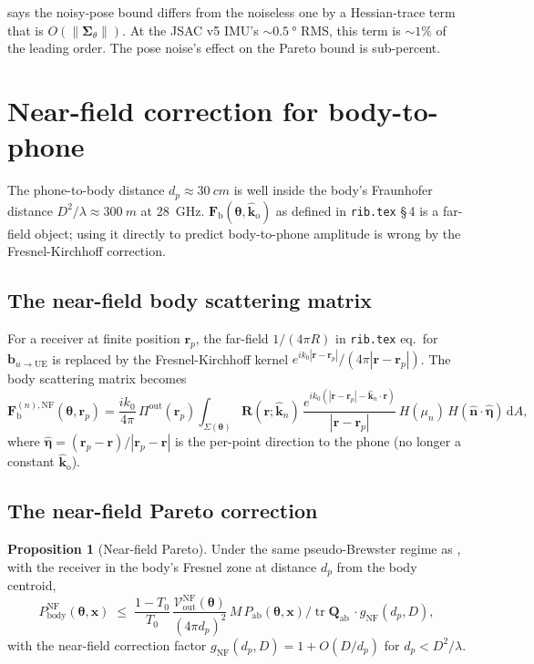 \documentclass[11pt,a4paper]{article}
\theoremstyle{definition}
\newtheorem{proposition}[proposition]{Proposition}
\newcommand{\khat}{\hat{\bm{k}}}
\newcommand{\nhat}{\hat{\bm{n}}}
\newcommand{\rr}{\mathbf{r}}
\DeclareMathOperator{\tr}{tr}
\newcommand{\diff}{\mathrm{d}}
\newcommand{\Qabs}{\mathbf{Q}_{\mathrm{ab}}}
\newcommand{\kout}{\hat{\bm{k}}_{\mathrm{o}}}
\newcommand{\Frib}{\mathbf{F}_{\mathrm{b}}}
\newcommand{\bvec}{\mathbf{b}}
\newcommand{\xvec}{\mathbf{x}}
\newcommand{\thetab}{\bm{\theta}}
\newcommand{\Pabs}{P_{\mathrm{ab}}}
\newcommand{\Pbody}{P_{\mathrm{body}}}
\begin{document}
 says the noisy-pose bound differs from
the noiseless one by a Hessian-trace term that is
$O(\|\bm\Sigma_\theta\|)$.  At the JSAC v5 IMU's $\sim
\SI{0.5}{\degree}$ RMS, this term is $\sim 1\%$ of the leading
order.  The pose noise's effect on the Pareto bound is
sub-percent.

\section{Near-field correction for body-to-phone}\label{sec:nearfield}

The phone-to-body distance $d_p\approx\SI{30}{cm}$ is well inside
the body's Fraunhofer distance $D^2/\lambda\approx\SI{300}{m}$ at
\SI{28}{GHz}.  $\Frib(\thetab,\kout)$ as defined in
\texttt{rib.tex} \S\,4 is a far-field object; using it directly to
predict body-to-phone amplitude is wrong by the Fresnel-Kirchhoff
correction.

\subsection{The near-field body scattering matrix}

For a receiver at finite position $\rr_p$, the far-field
$1/(4\pi R)$ in \texttt{rib.tex} eq.\ for $\bvec_{u\to\mathrm{UE}}$
is replaced by the Fresnel-Kirchhoff kernel
$e^{ik_0|\rr-\rr_p|}/(4\pi|\rr-\rr_p|)$.  The body scattering
matrix becomes
\begin{equation}\label{eq:Fb-NF}
  \Frib^{(n),\mathrm{NF}}(\thetab,\rr_p)
  =\frac{ik_0}{4\pi}\,\Pi^{\mathrm{out}}(\rr_p)\!
   \int_{\Sigma(\thetab)}\!\!\mathbf{R}(\rr;\khat_n)\,
   \frac{e^{ik_0(|\rr-\rr_p|-\khat_n\cdot\rr)}}{|\rr-\rr_p|}\,
   H(\mu_n)\,H(\nhat\cdot\hat{\bm\eta})\,\diff A,
\end{equation}
where $\hat{\bm\eta}=(\rr_p-\rr)/|\rr_p-\rr|$ is the per-point
direction to the phone (no longer a constant $\kout$).

\subsection{The near-field Pareto correction}

\begin{proposition}[Near-field Pareto]\label{prop:nf-pareto}
Under the same pseudo-Brewster regime as
, with the receiver in the body's Fresnel zone
at distance $d_p$ from the body centroid,
\begin{equation}\label{eq:nf-pareto}
  \Pbody^{\mathrm{NF}}(\thetab,\xvec)
  \;\le\;
  \frac{1-T_0}{T_0}\,
  \frac{\mathcal{V}_{\mathrm{out}}^{\mathrm{NF}}(\thetab)}
       {(4\pi d_p)^2}\,
   M\,\Pabs(\thetab,\xvec)/\tr\Qabs\,
  \cdot g_{\mathrm{NF}}(d_p,D),
\end{equation}
with the near-field correction factor $g_{\mathrm{NF}}(d_p,D)
=1+O(D/d_p)$ for $d_p<D^2/\lambda$.
\end{proposition}
\end{document}
